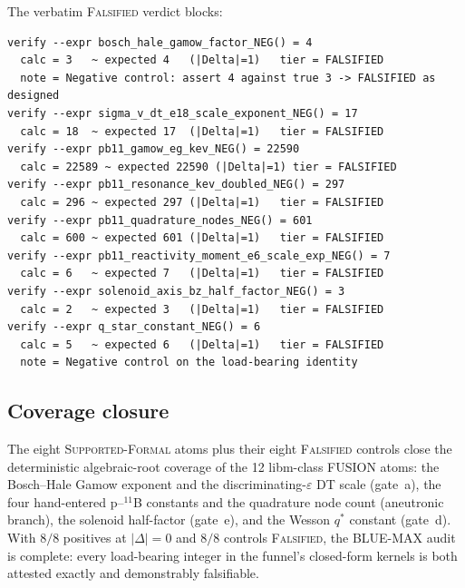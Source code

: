 The verbatim \textsc{Falsified} verdict blocks:
\begin{lstlisting}
verify --expr bosch_hale_gamow_factor_NEG() = 4
  calc = 3   ~ expected 4   (|Delta|=1)   tier = FALSIFIED
  note = Negative control: assert 4 against true 3 -> FALSIFIED as designed
verify --expr sigma_v_dt_e18_scale_exponent_NEG() = 17
  calc = 18  ~ expected 17  (|Delta|=1)   tier = FALSIFIED
verify --expr pb11_gamow_eg_kev_NEG() = 22590
  calc = 22589 ~ expected 22590 (|Delta|=1) tier = FALSIFIED
verify --expr pb11_resonance_kev_doubled_NEG() = 297
  calc = 296 ~ expected 297 (|Delta|=1)   tier = FALSIFIED
verify --expr pb11_quadrature_nodes_NEG() = 601
  calc = 600 ~ expected 601 (|Delta|=1)   tier = FALSIFIED
verify --expr pb11_reactivity_moment_e6_scale_exp_NEG() = 7
  calc = 6   ~ expected 7   (|Delta|=1)   tier = FALSIFIED
verify --expr solenoid_axis_bz_half_factor_NEG() = 3
  calc = 2   ~ expected 3   (|Delta|=1)   tier = FALSIFIED
verify --expr q_star_constant_NEG() = 6
  calc = 5   ~ expected 6   (|Delta|=1)   tier = FALSIFIED
  note = Negative control on the load-bearing identity
\end{lstlisting}

\subsection{Coverage closure}
\label{app:bluemax:closure}

The eight \textsc{Supported-Formal} atoms plus their eight \textsc{Falsified}
controls close the deterministic algebraic-root coverage of the 12 libm-class
FUSION atoms: the Bosch--Hale Gamow exponent and the discriminating-$\varepsilon$
DT scale (gate~a), the four hand-entered p--$^{11}$B constants and the
quadrature node count (aneutronic branch), the solenoid half-factor (gate~e),
and the Wesson $q^{*}$ constant (gate~d). With $8/8$ positives at $|\Delta|=0$
and $8/8$ controls \textsc{Falsified}, the BLUE-MAX audit is complete: every
load-bearing integer in the funnel's closed-form kernels is both attested
exactly and demonstrably falsifiable.
